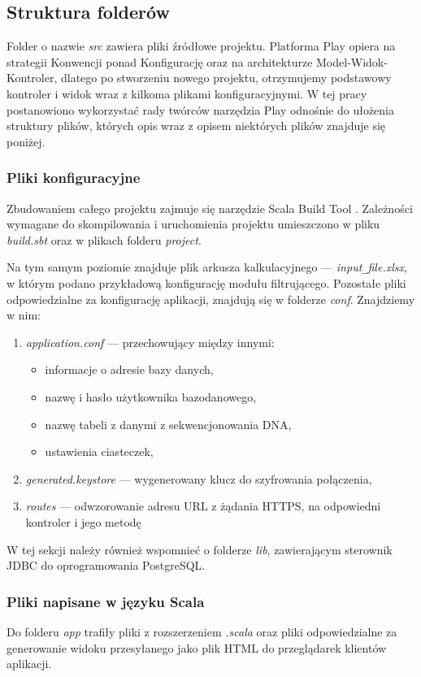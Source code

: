 \documentclass[a4paper,12pt,twoside]{article}
\begin{document}
\subsection{Struktura folderów}
Folder o nazwie \textit{src} zawiera pliki źródłowe projektu.
Platforma Play opiera na strategii Konwencji ponad Konfigurację
oraz na architekturze Model-Widok-Kontroler,
dlatego po stworzeniu nowego projektu,
otrzymujemy podstawowy kontroler i widok wraz z kilkoma plikami konfiguracyjnymi.
W tej pracy postanowiono wykorzystać rady twórców narzędzia Play
odnośnie do ułożenia struktury plików, których opis wraz z opisem niektórych plików znajduje się poniżej.

\subsubsection{Pliki konfiguracyjne}
Zbudowaniem całego projektu zajmuje się narzędzie Scala Build Tool \cite{sbt}.
Zależności wymagane do skompilowania i uruchomienia projektu
umieszczono w pliku \textit{build.sbt} oraz w plikach folderu \textit{project}.

Na tym samym poziomie znajduje plik arkusza kalkulacyjnego —
\textit{input}\verb!_!\textit{file.xlsx}, w którym podano przykładową konfigurację modułu filtrującego.
Pozostałe pliki odpowiedzialne za konfigurację aplikacji, znajdują
się w folderze \textit{conf}.
Znajdziemy w nim:
\begin{enumerate}[1)]
\item \textit{application.conf} — przechowujący między innymi:
\begin{itemize}
\item informacje o adresie bazy danych,
\item nazwę i hasło użytkownika bazodanowego,
\item nazwę tabeli z danymi z sekwencjonowania DNA,
\item ustawienia ciasteczek,
\end{itemize}
\item \textit{generated.keystore} — wygenerowany klucz do szyfrowania połączenia,
\item \textit{routes} — odwzorowanie adresu URL z żądania HTTPS, na odpowiedni kontroler
i jego metodę
\end{enumerate}

W tej sekcji należy również wspomnieć o folderze \textit{lib}, zawierającym
sterownik JDBC do oprogramowania PostgreSQL.

\newpage
\subsubsection{Pliki napisane w języku Scala}
Do folderu \textit{app} trafiły pliki z rozszerzeniem \textit{.scala} oraz pliki
odpowiedzialne za generowanie widoku przesyłanego jako plik HTML do
przeglądarek klientów aplikacji.
\end{document}
